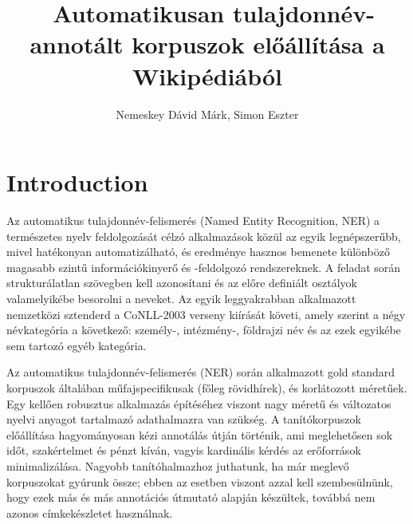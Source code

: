 \documentclass{llncs}
\begin{document}
\pagestyle{myheadings}
\def\leftmark{{\rm IX. Magyar Sz\'am\'\i t\'og\'epes Nyelv\'eszeti Konferencia}}
\def\rightmark{{\rm Szeged, 2013. január 7-8.}}

\setcounter{page}{3}

\title{\ \break Automatikusan tulajdonnév-annotált korpuszok előállítása a Wikipédiából}
\author{Nemeskey Dávid Márk, Simon Eszter}

\maketitle

\section{Introduction}

Az automatikus tulajdonnév-felismerés (Named Entity Recognition, NER) a természetes nyelv feldolgozását célzó alkalmazások közül az egyik legnépszerűbb, mivel hatékonyan automatizálható, és eredménye hasznos bemenete különböző magasabb szintű információkinyerő és -feldolgozó rendszereknek. A feladat során strukturálatlan szövegben kell azonosítani és az előre definiált osztályok valamelyikébe besorolni a neveket. Az egyik leggyakrabban alkalmazott nemzetközi sztenderd a CoNLL-2003 verseny kiírását követi, amely szerint a négy névkategória a következő: személy-, intézmény-, földrajzi név és az ezek egyikébe sem tartozó egyéb kategória. 


Az automatikus tulajdonnév-felismerés (NER) során alkalmazott gold standard korpuszok általában műfajspecifikusak (főleg rövidhírek), és korlátozott méretűek. Egy kellően robusztus alkalmazás építéséhez viszont nagy méretű és változatos nyelvi anyagot tartalmazó adathalmazra van szükség. A tanítókorpuszok előállítása hagyományosan kézi annotálás útján történik, ami meglehetősen sok időt, szakértelmet és pénzt kíván, vagyis kardinális kérdés az erőforrások minimalizálása. Nagyobb tanítóhalmazhoz juthatunk, ha már meglevő korpuszokat gyúrunk össze; ebben az esetben viszont azzal kell szembesülnünk, hogy ezek más és más annotációs útmutató alapján készültek, továbbá nem azonos címkekészletet használnak. 
\end{document}
